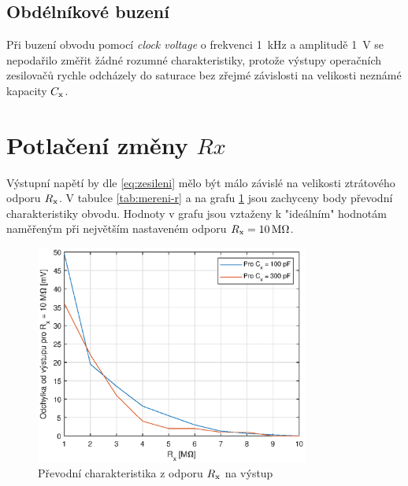 \documentclass[twoside]{article}
\newcommand{\Cx}{C_{\rm x}}
\newcommand{\Rx}{R_{\rm x}}
\begin{document}
\subsection{Obdélníkové buzení}

Při buzení obvodu pomocí \textit{clock voltage} o frekvenci \SI{1}{kHz} a amplitudě \SI{1}{V}
se nepodařilo změřit žádné rozumné charakteristiky,
protože výstupy operačních zesilovačů rychle odcházely do saturace
bez zřejmé závislosti na velikosti neznámé kapacity $\Cx$.

\clearpage

\section{Potlačení změny $Rx$}

Výstupní napětí by dle \eqref{eq:zesileni} mělo být málo závislé
na velikosti ztrátového odporu $\Rx$. V tabulce \ref{tab:mereni-r}
a na grafu \ref{fig:mereni-r} jsou zachyceny body převodní charakteristiky obvodu.
Hodnoty v grafu jsou vztaženy k "ideálním" hodnotám naměřeným při největším nastaveném odporu
$\Rx = \SI{10}{\mega\ohm}$.

\begin{figure}[h]
    \centering
    \includegraphics[width=0.8\textwidth]{mereni-r.eps}
    \caption{Převodní charakteristika z odporu $\Rx$ na výstup}
    \label{fig:mereni-r}
\end{figure}
\end{document}
